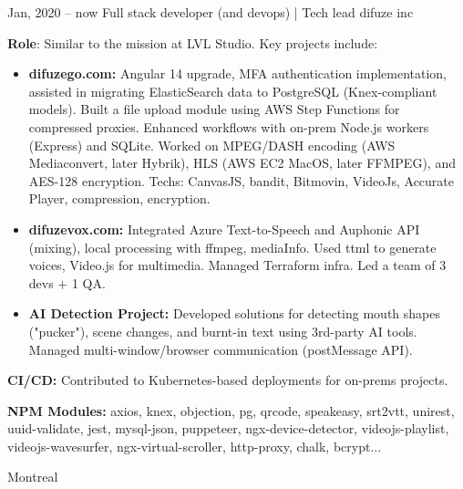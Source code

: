 \documentclass[
  a4paper,
   maincolor=cvblue,
   sectioncolor=cvblue,
   sidebarwidth=0.323\paperwidth,
]{fortysecondscv}
\begin{document}
\newpage
\restoregeometry
{}\paperwidth

\makefrontsidebar

\vspace*{-3.5em} %



\begin{cvtableNew}
  \cvitemRightNew
      {Jan, 2020 – now} %
      {Full stack developer (and devops) | Tech lead} %
      {difuze inc} %
      {
        \vspace{0.1pt} %
        \fontsize{10.8pt}{12pt}\selectfont %
        \textbf{Role}: Similar to the mission at LVL Studio. Key projects include:\vspace{5pt}

        \begin{itemize}[itemsep=-1mm, topsep=0pt, leftmargin=8pt]
          \item \textbf{difuzego.com:} Angular 14 upgrade, MFA authentication implementation, assisted in migrating ElasticSearch data to PostgreSQL (Knex-compliant models). Built a file upload module using AWS Step Functions for compressed proxies. Enhanced workflows with on-prem Node.js workers (Express) and SQLite. Worked on MPEG/DASH encoding (AWS Mediaconvert, later Hybrik), HLS (AWS EC2 MacOS, later FFMPEG), and AES-128 encryption. Techs: CanvasJS, bandit, Bitmovin, VideoJs, Accurate Player, compression, encryption.\vspace{5pt}
          \item \textbf{difuzevox.com:} Integrated Azure Text-to-Speech and Auphonic API (mixing), local processing with ffmpeg, mediaInfo. Used ttml to generate voices, Video.js for multimedia. Managed Terraform infra. Led a team of 3 devs + 1 QA.\vspace{5pt}
          \item \textbf{AI Detection Project:} Developed solutions for detecting mouth shapes ("pucker"), scene changes, and burnt-in text using 3rd-party AI tools. Managed multi-window/browser communication (postMessage API).\vspace{5pt}
        \end{itemize}

        \textbf{CI/CD:} Contributed to Kubernetes-based deployments for on-prems projects.\vspace{5pt}

        \textbf{NPM Modules:} axios, knex, objection, pg, qrcode, speakeasy, srt2vtt, unirest, uuid-validate, jest, mysql-json, puppeteer, ngx-device-detector, videojs-playlist, videojs-wavesurfer, ngx-virtual-scroller, http-proxy, chalk, bcrypt...
      }
      {Montreal} %


\end{cvtableNew}
\end{document}
